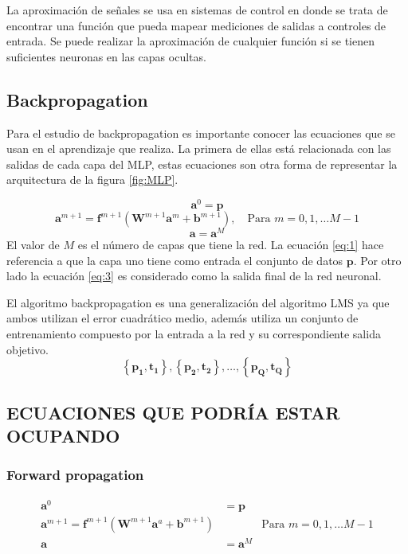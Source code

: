 \documentclass[12pt, titlepage]{article}
\begin{document}
La aproximación de señales se usa en sistemas de control en donde se trata de encontrar una función que pueda mapear mediciones de salidas a controles de entrada. Se puede realizar la aproximación de cualquier función si se tienen suficientes neuronas en las capas ocultas. 
\subsection{Backpropagation}
Para el estudio de backpropagation es importante conocer las ecuaciones que se usan en el aprendizaje que realiza. La primera de ellas está relacionada con las salidas de cada capa del MLP, estas ecuaciones son otra forma de representar la arquitectura de la figura \ref{fig:MLP}.

\begin{equation} \label{eq:1}
\boldsymbol{a}^0 = \boldsymbol{p}
\end{equation}
\begin{equation} \label{eq:2}
\boldsymbol{a}^{m+1} = \boldsymbol{f}^{m+1}(\boldsymbol{W}^{m+1}\boldsymbol{a}^{m}+\boldsymbol{b}^{m+1}
), \quad \text{Para $m=0, 1, \ldots M-1$}
\end{equation}
\begin{equation} \label{eq:3}
    \boldsymbol{a} = \boldsymbol{a}^{M}
\end{equation}
El valor de $M$ es el número de capas que tiene la red. La ecuación \ref{eq:1} hace referencia a que la capa uno tiene como entrada el conjunto de datos $\boldsymbol{p}$. Por otro lado la ecuación \ref{eq:3} es considerado como la salida final de la red neuronal.

El algoritmo backpropagation es una generalización del algoritmo LMS ya que ambos utilizan el error cuadrático medio, además utiliza un conjunto de entrenamiento compuesto por la entrada a la red y su correspondiente salida objetivo.
\[ \left\lbrace \boldsymbol{p_1}, \boldsymbol{t_1} \right\rbrace, \left\lbrace \boldsymbol{p_2}, \boldsymbol{t_2} \right\rbrace, \dots, \left\lbrace \boldsymbol{p_Q}, \boldsymbol{t_Q} \right\rbrace  \]

\subsection{ECUACIONES QUE PODRÍA ESTAR OCUPANDO}
\subsubsection{Forward propagation}
\begin{align*}
 \boldsymbol{a}^0 &= \boldsymbol{p} \\
 \boldsymbol{a}^{m+1} = 
\boldsymbol{f}^{m+1}(\boldsymbol{W}^{m+1}\boldsymbol{a}^{a}+\boldsymbol{b}^{m+1}
) & & \text{Para $m=0, 1, \ldots M-1$} \\
 \boldsymbol{a} &= \boldsymbol{a}^{M}
\end{align*}
\end{document}
